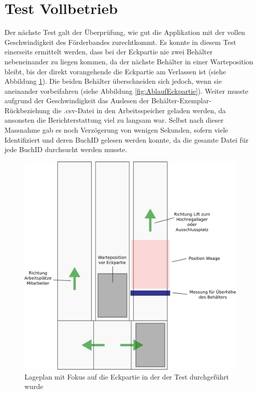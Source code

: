 \documentclass[parskip=full, a4paper]{scrartcl}
\begin{document}
\section{Test Vollbetrieb}
Der nächste Test galt der Überprüfung, wie gut die Applikation mit der vollen Geschwindigkeit des Förderbandes zurechtkommt. Es konnte in diesem Test einerseits ermittelt werden, dass bei der Eckpartie nie zwei Behälter nebeneinander zu liegen kommen, da der nächste Behälter in einer Warteposition bleibt, bis der direkt vorangehende die Eckpartie am Verlassen ist (siehe Abbildung \ref{fig:PlanEckpartie}). Die beiden Behälter überschneiden sich jedoch, wenn sie aneinander vorbeifahren (siehe Abbildung \ref{fig:AblaufEckpartie}). Weiter musste aufgrund der Geschwindigkeit das Auslesen der Behälter-Exemplar-Rückbeziehung die .csv-Datei in den Arbeitsspeicher geladen werden, da ansonsten die Berichterstattung viel zu langsam war. Selbst nach dieser Massnahme gab es noch Verzögerung von wenigen Sekunden, sofern viele Identifiziert und deren BuchID gelesen werden konnte, da die gesamte Datei für jede BuchID durchsucht werden musste.

\begin{figure}[htb]
	\centering
	\includegraphics[keepaspectratio,width=0.6\linewidth]{img/PlanEckpartie.png}
	\caption{Lageplan mit Fokus auf die Eckpartie in der der Test durchgeführt wurde}
	\label{fig:PlanEckpartie}
\end{figure}
\end{document}
